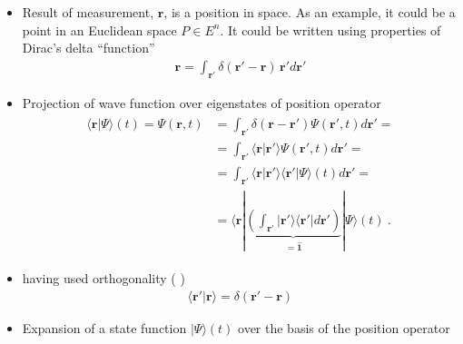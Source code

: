 \documentclass[letterpaper,10pt,english]{jupyterBook}
\begin{document}
\begin{itemize}
\item {} 
\sphinxAtStartPar
Result of measurement, \(\mathbf{r}\), is a position in space. As an example, it could be a point in an Euclidean space \(P \in E^n\). It could be written using properties of Dirac’s delta “function”
\begin{equation*}
\begin{split}
    \mathbf{r} = \int_{\mathbf{r}'} \delta (\mathbf{r}'-\mathbf{r}) \, \mathbf{r}' d \mathbf{r}'
  \end{split}
\end{equation*}
\item {} 
\sphinxAtStartPar
Projection of wave function over eigenstates of position operator
\begin{equation*}
\begin{split}\begin{aligned}
  \langle \mathbf{r} | \Psi \rangle(t) = \Psi(\mathbf{r}, t)
  & = \int_{\mathbf{r}'} \delta(\mathbf{r} - \mathbf{r}') \Psi(\mathbf{r}',t) d \mathbf{r}' = \\
  & = \int_{\mathbf{r}'} \langle \mathbf{r} | \mathbf{r}' \rangle \Psi(\mathbf{r}',t) d \mathbf{r}' = \\
  & = \int_{\mathbf{r}'} \langle \mathbf{r} | \mathbf{r}' \rangle \langle \mathbf{r}' | \Psi \rangle (t) d \mathbf{r}' = \\
  & = \langle \mathbf{r} | \underbrace{\left( \int_{\mathbf{r}'} | \mathbf{r}' \rangle \langle \mathbf{r}' | d \mathbf{r}' \right)}_{= \hat{\mathbf{1}}} | \Psi \rangle (t) \ .
  \end{aligned}\end{split}
\end{equation*}
\item {} 
\sphinxAtStartPar
having used orthogonality ( )
\begin{equation*}
\begin{split}\langle \mathbf{r}' | \mathbf{r} \rangle = \delta(\mathbf{r}' - \mathbf{r})\end{split}
\end{equation*}
\item {} 
\sphinxAtStartPar
Expansion of a state function \(|\Psi\rangle (t)\) over the basis of the position operator
\begin{equation*}
\begin{split}\begin{aligned}

\end{aligned}
\end{split}
\end{equation*}
\end{itemize}
\end{document}
